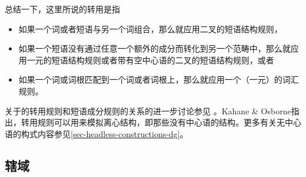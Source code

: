 总结一下，这里所说的转用是指
\begin{itemize}
\item 如果一个词或者短语与另一个词组合，那么就应用二叉的短语结构规则，
\item 如果一个短语没有通过任意一个额外的成分而转化到另一个范畴中，那么就应用一元的短语结构规则或者带有空中心语的二叉的短语结构规则，或者
\item 如果一个词或词根匹配到一个词或者词根上，那么就应用一个（一元）的词汇规则。
\end{itemize}
关于\tes 的转用规则和短语成分规则的关系的进一步讨论参见 \citet[\S~4.9.1--4.9.2]{KO2015a}。Kahane
\& Osborne指出，转用规则可以用来模拟离心结构，即那些没有中心语的结构。更多有关无中心语的构式内容参见\ref{sec-headless-constructions-dg}。

\subsection{辖域}

